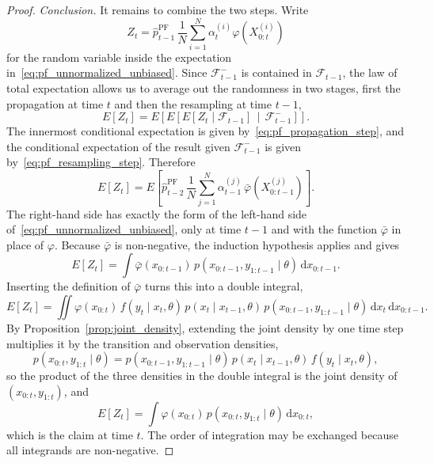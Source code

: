\begin{proof}
    \emph{Conclusion.} It remains to combine the two steps. Write
    \begin{equation}
        Z_t = \hat{p}^{\mathrm{PF}}_{t-1}\,\frac{1}{N}\sum_{i=1}^{N}\alpha_t^{(i)}\varphi(X_{0:t}^{(i)})
    \end{equation}
    for the random variable inside the expectation in~\eqref{eq:pf_unnormalized_unbiased}. Since $\mathcal{F}_{t-1}^{-}$ is contained in $\mathcal{F}_{t-1}$, the law of total expectation allows us to average out the randomness in two stages, first the propagation at time $t$ and then the resampling at time $t-1$,
    \begin{equation}
        E\left[Z_t\right] = E\left[E\left[E\left[Z_t\mid\mathcal{F}_{t-1}\right]\,\middle|\,\mathcal{F}_{t-1}^{-}\right]\right].
    \end{equation}
    The innermost conditional expectation is given by~\eqref{eq:pf_propagation_step}, and the conditional expectation of the result given $\mathcal{F}_{t-1}^{-}$ is given by~\eqref{eq:pf_resampling_step}. Therefore
    \begin{equation}
        E\left[Z_t\right] = E\left[\hat{p}^{\mathrm{PF}}_{t-2}\,\frac{1}{N}\sum_{j=1}^{N} \alpha_{t-1}^{(j)}\,\bar{\varphi}(X_{0:t-1}^{(j)})\right].
    \end{equation}
    The right-hand side has exactly the form of the left-hand side of~\eqref{eq:pf_unnormalized_unbiased}, only at time $t-1$ and with the function $\bar{\varphi}$ in place of $\varphi$. Because $\bar{\varphi}$ is non-negative, the induction hypothesis applies and gives
    \begin{equation}
        E\left[Z_t\right] = \int \bar{\varphi}(x_{0:t-1})\,p(x_{0:t-1},y_{1:t-1}\mid\theta)\,\mathrm{d}x_{0:t-1}.
    \end{equation}
    Inserting the definition of $\bar{\varphi}$ turns this into a double integral,
    \begin{equation}
        E\left[Z_t\right] = \iint \varphi(x_{0:t})\,f(y_t\mid x_t,\theta)\,p(x_t\mid x_{t-1},\theta)\,p(x_{0:t-1},y_{1:t-1}\mid\theta)\,\mathrm{d}x_t\,\mathrm{d}x_{0:t-1}.
    \end{equation}
    By Proposition~\ref{prop:joint_density}, extending the joint density by one time step multiplies it by the transition and observation densities,
    \begin{equation}
        p(x_{0:t},y_{1:t}\mid\theta) = p(x_{0:t-1},y_{1:t-1}\mid\theta)\,p(x_t\mid x_{t-1},\theta)\,f(y_t\mid x_t,\theta),
    \end{equation}
    so the product of the three densities in the double integral is the joint density of $(x_{0:t},y_{1:t})$, and
    \begin{equation}
        E\left[Z_t\right] = \int\varphi(x_{0:t})\,p(x_{0:t},y_{1:t}\mid\theta)\,\mathrm{d}x_{0:t},
    \end{equation}
    which is the claim at time $t$. The order of integration may be exchanged because all integrands are non-negative.
\end{proof}

